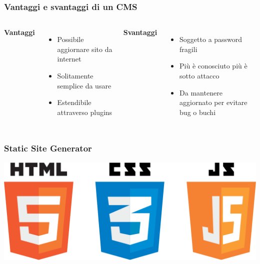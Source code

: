 \begin{frame}
	\frametitle{Vantaggi e svantaggi di un CMS}
	\begin{columns}
		\begin{center}
				\textbf{Vantaggi}
		\end{center}
		\begin{itemize}
			\item<2-> Possibile aggiornare sito da internet
			\item<3-> Solitamente semplice da usare
			\item<4-> Estendibile attraverso plugins
		\end{itemize}

		\begin{center}
		\textbf{Svantaggi}
		\end{center}
		\begin{itemize}
			\item<2-> Soggetto a password fragili
			\item<3-> Più è conosciuto più è sotto attacco
			\item<4-> Da mantenere aggiornato per evitare bug o buchi
		\end{itemize}

	\end{columns}
\end{frame}

\begin{frame}
	\frametitle{Static Site Generator}
	\begin{center}
	\includegraphics[scale=0.2]{img/html}
	\end{center}
\end{frame}

